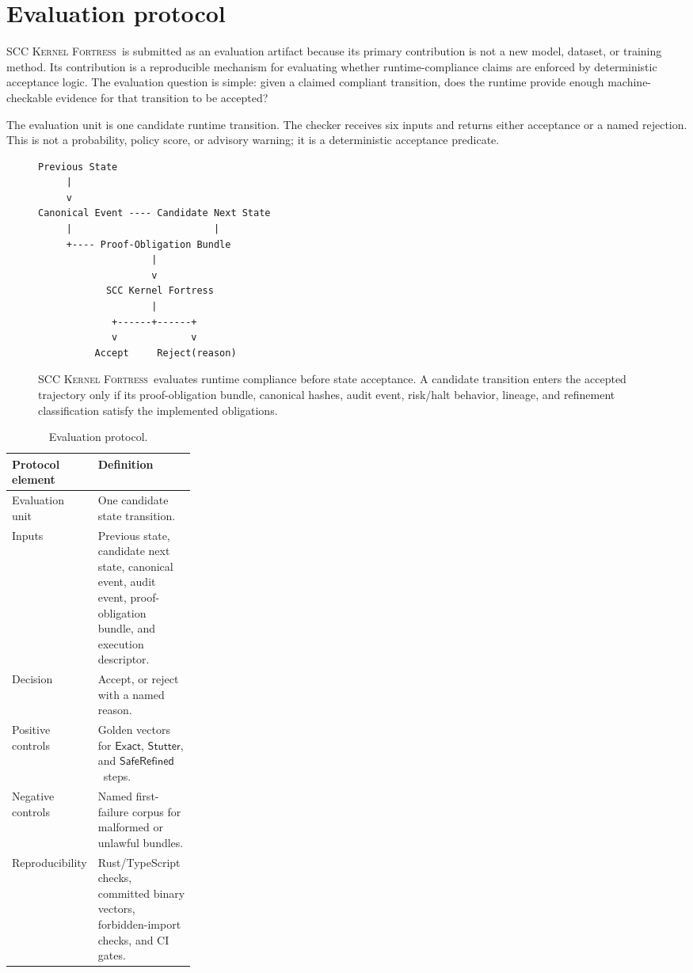 \documentclass{article}
\newcommand{\KF}{\textsc{SCC Kernel Fortress}}
\newcommand{\Exact}{\ensuremath{\mathsf{Exact}}}
\newcommand{\Stutter}{\ensuremath{\mathsf{Stutter}}}
\newcommand{\SafeRefined}{\ensuremath{\mathsf{SafeRefined}}}
\begin{document}
\section{Evaluation protocol}
\KF\ is submitted as an evaluation artifact because its primary contribution is not a new model, dataset, or training method. Its contribution is a reproducible mechanism for evaluating whether runtime-compliance claims are enforced by deterministic acceptance logic. The evaluation question is simple: given a claimed compliant transition, does the runtime provide enough machine-checkable evidence for that transition to be accepted?

The evaluation unit is one candidate runtime transition. The checker receives six inputs and returns either acceptance or a named rejection. This is not a probability, policy score, or advisory warning; it is a deterministic acceptance predicate.

\begin{figure}[t]
\centering
\begin{minipage}{0.82\linewidth}
\begin{verbatim}
Previous State
     |
     v
Canonical Event ---- Candidate Next State
     |                         |
     +---- Proof-Obligation Bundle
                    |
                    v
            SCC Kernel Fortress
                    |
             +------+------+
             v             v
          Accept     Reject(reason)
\end{verbatim}
\end{minipage}
\caption{\KF\ evaluates runtime compliance before state acceptance. A candidate transition enters the accepted trajectory only if its proof-obligation bundle, canonical hashes, audit event, risk/halt behavior, lineage, and refinement classification satisfy the implemented obligations.}
\label{fig:flow}
\end{figure}

\begin{table}[t]
\caption{Evaluation protocol.}
\label{tab:protocol}
\centering
\small
\begin{tabularx}{\linewidth}{p{0.27\linewidth}Y}
\toprule
Protocol element & Definition \\
\midrule
Evaluation unit & One candidate state transition. \\
Inputs & Previous state, candidate next state, canonical event, audit event, proof-obligation bundle, and execution descriptor. \\
Decision & Accept, or reject with a named reason. \\
Positive controls & Golden vectors for \Exact, \Stutter, and \SafeRefined\ steps. \\
Negative controls & Named first-failure corpus for malformed or unlawful bundles. \\
Reproducibility & Rust/TypeScript checks, committed binary vectors, forbidden-import checks, and CI gates. \\
\bottomrule
\end{tabularx}
\end{table}
\end{document}
